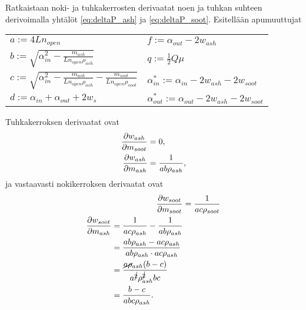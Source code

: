 
Ratkaistaan noki- ja tuhkakerrosten derivaatat noen ja tuhkan suhteen derivoimalla yhtälöt \eqref{eq:deltaP_ash} ja \eqref{eq:deltaP_soot}.
Esitellään apumuuttujat
\begin{center}
\begin{tabular}{ll}
    \( a := 4 L n_{open} \) & \( f := \alpha_{out} - 2 w_{ash} \) \\
    \( b := \sqrt{\alpha_{in}^2 - \frac{m_{ash}}{L n_{open} \rho_{ash}}} \) & \( q := \frac{1}{2} Q \mu \) \\
    \( c := \sqrt{\alpha_{in}^2 - \frac{m_{ash}}{L n_{open} \rho_{ash}} - \frac{m_{soot}}{L n_{open} \rho_{soot}}} \) & \( \alpha_{in}^* := \alpha_{in} - 2 w_{ash} - 2 w_{soot} \) \\
    \( d := \alpha_{in} + \alpha_{out} + 2w_s \) & \( \alpha_{out}^* := \alpha_{out} - 2 w_{ash} - 2 w_{soot} \)
\end{tabular}
\end{center}


Tuhkakerroksen derivaatat ovat
\begin{align}
    \frac{\partial w_{ash}}{\partial m_{soot}} & =0,\\
    \frac{\partial w_{ash}}{\partial m_{ash}} &= \frac{1}{ab\rho_{ash}},
\end{align}
ja vastaavasti nokikerroksen derivaatat ovat
\begin{align}
    \frac{\partial w_{soot}}{\partial m_{soot}} &= \frac{1}{ac\rho_{soot}}\\
    \begin{split}
    \frac{\partial w_{soot}}{\partial m_{ash}} &= \frac{1}{ac\rho_{ash}}-\frac{1}{ab\rho_{ash}}
    \\ &= \frac{ab \rho_{ash} - ac\rho_{ash}}{ab\rho_{ash}\cdot ac \rho_{ash}}
    \\ &= \frac{\cancel{a\rho}_{ash}(b-c)}{a^{\cancel{2}} \rho_{ash}^{\cancel{2}} bc}
    \\ &= \frac{b-c}{abc\rho_{ash}}.
    \end{split}
\end{align}

